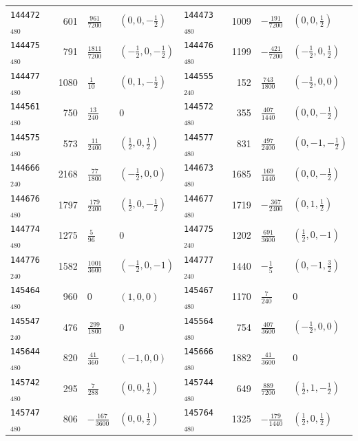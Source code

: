 {\begin{longtable}{@{}lrll@{\hspace{2em}}lrll@{}}
\texttt{144472}$_{480}$ & 601 & $\tfrac{961}{7200}$ & $(0,0,-\tfrac{1}{2})$ & \texttt{144473}$_{480}$ & 1009 & $-\tfrac{191}{7200}$ & $(0,0,\tfrac{1}{2})$\\
\texttt{144475}$_{480}$ & 791 & $\tfrac{1811}{7200}$ & $(-\tfrac{1}{2},0,-\tfrac{1}{2})$ & \texttt{144476}$_{480}$ & 1199 & $-\tfrac{421}{7200}$ & $(-\tfrac{1}{2},0,\tfrac{1}{2})$\\
\texttt{144477}$_{480}$ & 1080 & $\tfrac{1}{10}$ & $(0,1,-\tfrac{1}{2})$ & \texttt{144555}$_{240}$ & 152 & $\tfrac{743}{1800}$ & $(-\tfrac{1}{2},0,0)$\\
\texttt{144561}$_{480}$ & 750 & $\tfrac{13}{240}$ & 0 & \texttt{144572}$_{480}$ & 355 & $\tfrac{407}{1440}$ & $(0,0,-\tfrac{1}{2})$\\
\texttt{144575}$_{480}$ & 573 & $\tfrac{11}{2400}$ & $(\tfrac{1}{2},0,\tfrac{1}{2})$ & \texttt{144577}$_{480}$ & 831 & $\tfrac{497}{2400}$ & $(0,-1,-\tfrac{1}{2})$\\
\texttt{144666}$_{240}$ & 2168 & $\tfrac{77}{1800}$ & $(-\tfrac{1}{2},0,0)$ & \texttt{144673}$_{480}$ & 1685 & $\tfrac{169}{1440}$ & $(0,0,-\tfrac{1}{2})$\\
\texttt{144676}$_{480}$ & 1797 & $\tfrac{179}{2400}$ & $(\tfrac{1}{2},0,-\tfrac{1}{2})$ & \texttt{144677}$_{480}$ & 1719 & $-\tfrac{367}{2400}$ & $(0,1,\tfrac{1}{2})$\\
\texttt{144774}$_{480}$ & 1275 & $\tfrac{5}{96}$ & 0 & \texttt{144775}$_{240}$ & 1202 & $\tfrac{691}{3600}$ & $(\tfrac{1}{2},0,-1)$\\
\texttt{144776}$_{240}$ & 1582 & $\tfrac{1001}{3600}$ & $(-\tfrac{1}{2},0,-1)$ & \texttt{144777}$_{240}$ & 1440 & $-\tfrac{1}{5}$ & $(0,-1,\tfrac{3}{2})$\\
\texttt{145464}$_{480}$ & 960 & $0$ & $(1,0,0)$ & \texttt{145467}$_{480}$ & 1170 & $\tfrac{7}{240}$ & 0\\
\texttt{145547}$_{240}$ & 476 & $\tfrac{299}{1800}$ & 0 & \texttt{145564}$_{480}$ & 754 & $\tfrac{407}{3600}$ & $(-\tfrac{1}{2},0,0)$\\
\texttt{145644}$_{480}$ & 820 & $\tfrac{41}{360}$ & $(-1,0,0)$ & \texttt{145666}$_{480}$ & 1882 & $\tfrac{41}{3600}$ & 0\\
\texttt{145742}$_{480}$ & 295 & $\tfrac{7}{288}$ & $(0,0,\tfrac{1}{2})$ & \texttt{145744}$_{480}$ & 649 & $\tfrac{889}{7200}$ & $(\tfrac{1}{2},1,-\tfrac{1}{2})$\\
\texttt{145747}$_{480}$ & 806 & $-\tfrac{167}{3600}$ & $(0,0,\tfrac{1}{2})$ & \texttt{145764}$_{480}$ & 1325 & $-\tfrac{179}{1440}$ & $(\tfrac{1}{2},0,\tfrac{1}{2})$\\

\end{longtable}}
